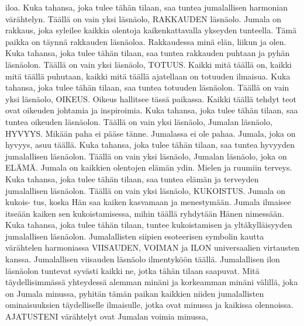 {\begin{songs}{}
        iloa. Kuka tahansa, joka tulee tähän tilaan, saa
        tuntea jumalallisen harmonian värähtelyn.
        \parspace
        Täällä on vain yksi läsnäolo, RAKKAUDEN läsnäolo.
        Jumala on rakkaus, joka syleilee kaikkia olentoja
        kaikenkattavalla ykseyden tunteella. Tämä paikka on
        täynnä rakkauden läsnäoloa. Rakkaudessa minä elän,
        liikun ja olen. Kuka tahansa, joka tulee tähän tilaan,
        saa tuntea rakkauden puhtaan ja pyhän läsnäolon.
        \parspace
        Täällä on vain yksi läsnäolo, TOTUUS. Kaikki mitä
        täällä on, kaikki mitä täällä puhutaan, kaikki mitä
        täällä ajatellaan on totuuden ilmaisua. Kuka tahansa,
        joka tulee tähän tilaan, saa tuntea totuuden läsnäolon.
        \parspace
        Täällä on vain yksi läsnäolo, OIKEUS. Oikeus hallitsee
        tässä paikassa. Kaikki täällä tehdyt teot ovat oikeuden
        johtamia ja inspiroimia. Kuka tahansa, joka tulee tähän
        tilaan, saa tuntea oikeuden läsnäolon.
        \parspace
        Täällä on vain yksi läsnäolo, Jumalan läsnäolo, HYVYYS.
        Mikään paha ei pääse tänne. Jumalassa ei ole pahaa.
        Jumala, joka on hyvyys, asuu täällä. Kuka tahansa, joka
        tulee tähän tilaan, saa tuntea hyvyyden jumalallisen
        läsnäolon.
        \parspace
        Täällä on vain yksi läsnäolo, Jumalan läsnäolo, joka on
        ELÄMÄ. Jumala on kaikkien olentojen elämän ydin.
        Mielen ja ruumiin terveys. Kuka tahansa, joka tulee
        tähän tilaan, saa tuntea elämän ja terveyden jumalallisen
        läsnäolon.
        \parspace
        Täällä on vain yksi läsnäolo, KUKOISTUS. Jumala on kukois-
        tus, koska Hän saa kaiken kasvamaan ja menestymään.
        Jumala ilmaisee itseään kaiken sen kukoistamisessa,
        mihin täällä ryhdytään Hänen nimessään. Kuka tahansa,
        joka tulee tähän tilaan, tuntee kukoistamisen ja
        yltäkylläisyyden jumalallisen läsnäolon.
        \parspace
        Jumalallisten siipien esoteerisen symbolin kautta
        värähtelen harmoniassa VIISAUDEN, VOIMAN ja ILON
        universaalien virtausten kanssa. Jumalallisen viisauden
        läsnäolo ilmentyköön täällä. Jumalallisen ilon
        läsnäolon tuntevat syvästi kaikki ne, jotka tähän
        tilaan saapuvat.
        \parspace
        Mitä täydellisimmässä yhteydessä alemman minäni ja
        korkeamman minäni välillä, joka on Jumala minussa,
        pyhitän tämän paikan kaikkien niiden jumalallisten
        ominaisuuksien täydelliselle ilmaisulle, jotka ovat
        minussa ja kaikissa olennoissa.
        \parspace
        AJATUSTENI värähtelyt ovat Jumalan voimia minussa,

\end{songs}}
